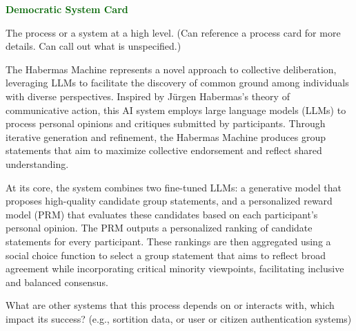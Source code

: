 \clearpage


\begin{center}
    {\textcolor{darkgreen}{\Large\bfseries Democratic System Card}}
\end{center}

    \begin{describe}[grey]
        The process or a system at a high level. (Can reference a process card for more details. Can call out what is unspecified.)
    \end{describe}

    The Habermas Machine represents a novel approach to collective deliberation, leveraging LLMs to facilitate the discovery of common ground among individuals with diverse perspectives. Inspired by Jürgen Habermas's theory of communicative action, this AI system employs large language models (LLMs) to process personal opinions and critiques submitted by participants. Through iterative generation and refinement, the Habermas Machine produces group statements that aim to maximize collective endorsement and reflect shared understanding.

    At its core, the system combines two fine-tuned LLMs: a generative model that proposes high-quality candidate group statements, and a personalized reward model (PRM) that evaluates these candidates based on each participant’s personal opinion. The PRM outputs a personalized ranking of candidate statements for every participant. These rankings are then aggregated using a social choice function to select a group statement that aims to reflect broad agreement while incorporating critical minority viewpoints, facilitating inclusive and balanced consensus.

    \begin{describe}[grey]
        What are other systems that this process depends on or interacts with, which impact its success? (e.g., sortition data, or user or citizen authentication systems)
    \end{describe}

